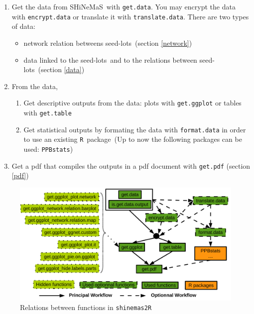 \documentclass{article}\usepackage[]{graphicx}\usepackage[]{color}
\newcommand{\R}{\texttt{R}}
\renewcommand{\sl}{seed-lots}
\newcommand{\BD}{SHiNeMaS}
\newcommand{\pack}{\texttt{shinemas2R}}
\begin{document}
\begin{enumerate}
\item Get the data from \BD~with \texttt{get.data}. You may encrypt the data with \texttt{encrypt.data} or translate it with \texttt{translate.data}.
There are two types of data:
\begin{itemize}
\item network relation betweens \sl~(section \ref{network})
\item data linked to the \sl~and to the relations between \sl~(section \ref{data})
\end{itemize}

\item From the data,
	\begin{enumerate}
	\item Get descriptive outputs from the data: plots with \texttt{get.ggplot} or tables with \texttt{get.table}
	\item Get statistical outputs by formating the data with \texttt{format.data} in order to use an existing \R~package~(Up to now the following packages can be used: \texttt{PPBstats})
	\end{enumerate}
\item Get a pdf that compiles the outputs in a pdf document with \texttt{get.pdf} (section \ref{pdf})
\end{enumerate}


\begin{figure}[H]
\begin{center}
%
\includegraphics[width=\textwidth]{shinemas2R_function_relations}
\end{center}
\caption{Relations between functions in \pack}
\label{function_relations}
\end{figure}
\end{document}
